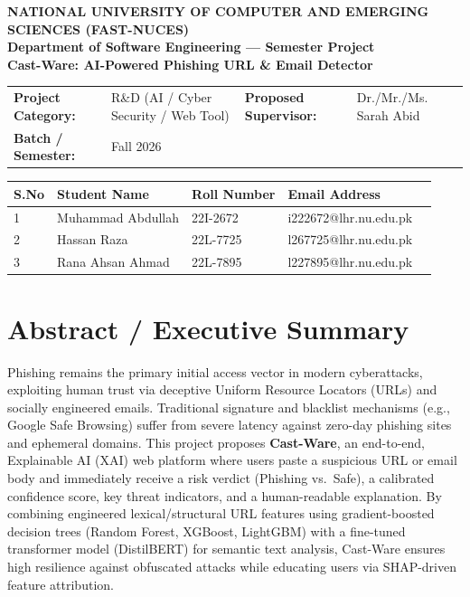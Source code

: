 \documentclass[10pt, a4paper]{article}
\begin{document}
\begin{center}
    {\Large \textbf{NATIONAL UNIVERSITY OF COMPUTER AND EMERGING SCIENCES (FAST-NUCES)}}\\[2pt]
    {\normalsize \textbf{Department of Software Engineering --- Semester Project}}\\[6pt]
    {\LARGE \textbf{\color{fastblue} Cast-Ware: AI-Powered Phishing URL \& Email Detector}}
\end{center}

\vspace{2pt}
\begin{tabularx}{\textwidth}{@{} >{\bfseries}l X >{\bfseries}l l @{}}
    \toprule
    Project Category: & R\&D (AI / Cyber Security / Web Tool) & Proposed Supervisor: & Dr./Mr./Ms. Sarah Abid \\
    Batch / Semester: & Fall 2026 \\
    \bottomrule
\end{tabularx}

\vspace{4pt}
\begin{tabularx}{\textwidth}{@{} l X l l l @{}}
    \toprule
    \textbf{S.No} & \textbf{Student Name} & \textbf{Roll Number} & \textbf{Email Address}\\
    \midrule
    1 & Muhammad Abdullah & 22I-2672 & i222672@lhr.nu.edu.pk \\
    2 & Hassan Raza & 22L-7725 & l267725@lhr.nu.edu.pk  \\
    3 & Rana Ahsan Ahmad & 22L-7895 & l227895@lhr.nu.edu.pk  \\
    \bottomrule
\end{tabularx}

\section{Abstract / Executive Summary}
Phishing remains the primary initial access vector in modern cyberattacks, exploiting human trust via deceptive Uniform Resource Locators (URLs) and socially engineered emails. Traditional signature and blacklist mechanisms (e.g., Google Safe Browsing) suffer from severe latency against zero-day phishing sites and ephemeral domains. This project proposes \textbf{Cast-Ware}, an end-to-end, Explainable AI (XAI) web platform where users paste a suspicious URL or email body and immediately receive a risk verdict (Phishing vs.\ Safe), a calibrated confidence score, key threat indicators, and a human-readable explanation. By combining engineered lexical/structural URL features using gradient-boosted decision trees (Random Forest, XGBoost, LightGBM) with a fine-tuned transformer model (DistilBERT) for semantic text analysis, Cast-Ware ensures high resilience against obfuscated attacks while educating users via SHAP-driven feature attribution.
\end{document}
